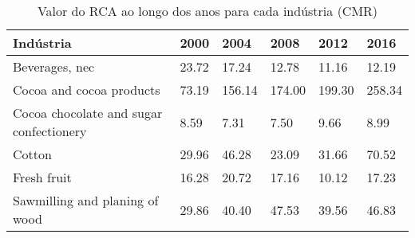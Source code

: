 \begin{table}
\centering
\caption{Valor do RCA ao longo dos anos para cada indústria (CMR)}
\label{tab:ex3-tempo-CMR}
\begin{tabular}{p{6cm}p{1.5cm}p{1.5cm}p{1.5cm}p{1.5cm}p{1.5cm}}
\toprule
                              Indústria &  2000 &   2004 &   2008 &   2012 &   2016 \\
\midrule
                         Beverages, nec & 23.72 &  17.24 &  12.78 &  11.16 &  12.19 \\
               Cocoa and cocoa products & 73.19 & 156.14 & 174.00 & 199.30 & 258.34 \\
Cocoa chocolate and sugar confectionery &  8.59 &   7.31 &   7.50 &   9.66 &   8.99 \\
                                 Cotton & 29.96 &  46.28 &  23.09 &  31.66 &  70.52 \\
                            Fresh fruit & 16.28 &  20.72 &  17.16 &  10.12 &  17.23 \\
         Sawmilling and planing of wood & 29.86 &  40.40 &  47.53 &  39.56 &  46.83 \\
\bottomrule
\end{tabular}
\end{table}
